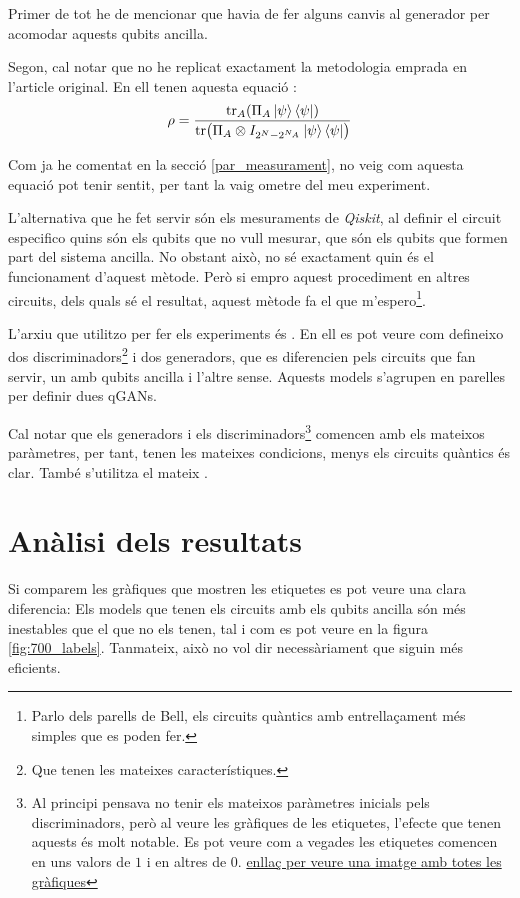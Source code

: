 Primer de tot he de mencionar que havia de fer alguns canvis al generador per acomodar aquests qubits ancilla. 

Segon, cal notar que no he replicat exactament la metodologia emprada en l'article original. En ell tenen aquesta equació \cite{QGAN_exp}: 
\begin{equation*}
\rho = \frac{\tr_A(\Pi_A \ket{\psi}\bra{\psi})}{\tr(\Pi_A\otimes I_{2^N-2^{N_A}}\ket{\psi}\bra{\psi})}
\end{equation*}

Com ja he comentat en la secció \ref{par_measurament}, no veig com aquesta equació pot tenir sentit, per tant la vaig ometre del meu experiment. 

L'alternativa que he fet servir són els mesuraments de \textit{Qiskit}, al definir el circuit especifico quins són els qubits que no vull mesurar, que són els qubits que formen part del sistema ancilla. No obstant això, no sé exactament quin és el funcionament d'aquest mètode. Però si empro aquest procediment en altres circuits, dels quals sé el resultat, aquest mètode fa el que m'espero\footnote{Parlo dels parells de Bell, els circuits quàntics amb entrellaçament més simples que es poden fer.}.

L'arxiu que utilitzo per fer els experiments és . En ell es pot veure com defineixo dos discriminadors\footnote{Que tenen les mateixes característiques.} i dos generadors, que es diferencien pels circuits que fan servir, un amb qubits ancilla i l'altre sense. Aquests models s'agrupen en parelles per definir dues qGANs.

Cal notar que els generadors i els discriminadors\footnote{Al principi pensava no tenir els mateixos paràmetres inicials pels discriminadors, però al veure les gràfiques de les etiquetes, l'efecte que tenen aquests és molt notable. Es pot veure com a vegades les etiquetes comencen en uns valors de $1$ i en altres de $0$. \href{https://drive.google.com/file/d/1kYZ1vmNYU17sofNluXFYnoATLfY5B0jG/view?usp=sharing}{enllaç per veure una imatge amb totes les gràfiques}} comencen amb els mateixos paràmetres, per tant, tenen les mateixes condicions, menys els circuits quàntics és clar. També s'utilitza el mateix .

\section{Anàlisi dels resultats}
Si comparem les gràfiques que mostren les etiquetes es pot veure una clara diferencia: Els models que tenen els circuits amb els qubits ancilla són més inestables que el que no els tenen, tal i com es pot veure en la figura \ref{fig:700_labels}. Tanmateix, això no vol dir necessàriament que siguin més eficients. 

